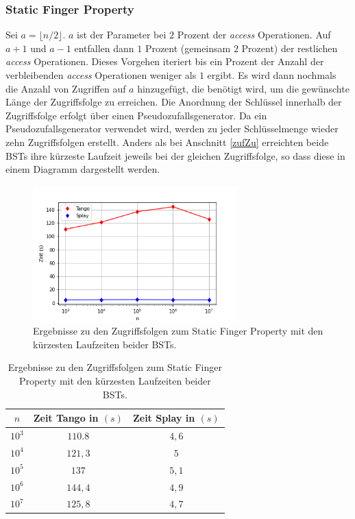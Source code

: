 \documentclass[a4paper,12pt]{article}
\begin{document}
\subsubsection{Static Finger Property}
Sei $a = \lfloor n / 2\rfloor$.  $a$ ist der Parameter bei $2$ Prozent der \textit{access} Operationen. Auf $a+1$ und $a-1$ entfallen dann $1$ Prozent (gemeinsam $2$ Prozent) der restlichen \textit{access} Operationen. Dieses Vorgehen iteriert bis ein Prozent der Anzahl der verbleibenden \textit{access} Operationen weniger als $1$ ergibt. Es wird dann nochmals die Anzahl von Zugriffen auf $a$ hinzugefügt, die benötigt wird, um die gewünschte Länge der Zugriffsfolge zu erreichen. Die Anordnung der Schlüssel innerhalb der Zugriffsfolge erfolgt über einen Pseudozufallsgenerator. Da ein Pseudozufallsgenerator verwendet wird, werden zu jeder Schlüsselmenge wieder zehn Zugriffsfolgen erstellt. Anders als bei Anschnitt \ref{zufZu} erreichten beide BSTs ihre kürzeste Laufzeit jeweils bei der gleichen Zugriffsfolge, so dass diese in einem Diagramm dargestellt werden.\\ 
\begin{figure}[H]
	\centering
	\includegraphics[width=0.7\textwidth]{Medien/laufzeittest/diagramm/staticfinger1}
	\caption{Ergebnisse zu den Zugriffsfolgen zum Static Finger Property mit den kürzesten Laufzeiten beider BSTs.}
\end{figure}
\begin{table}[H]
	\begin{center}
		\begin{tabular}[c]{|c|c|c|}
			\hline
			$n$ & Zeit Tango in $\left(s\right)$ &Zeit Splay in $\left(s\right)$ \\
			\hline
			$10^3$ & $110.8$ &$4,6$ \\
			\hline
			$10^4$  & $121,3$ &$5$  \\
			\hline
			$10^5$  & $137$ &  $5,1$  \\
			\hline
			$10^6$  & $144,4$ &$4,9$  \\
			\hline
			$10^7$  & $125,8$ &$4,7$  \\
			\hline
		\end{tabular}
		\caption{Ergebnisse zu den Zugriffsfolgen zum Static Finger Property mit den kürzesten Laufzeiten beider BSTs.} 
	\end{center}
\end{table}
\end{document}
